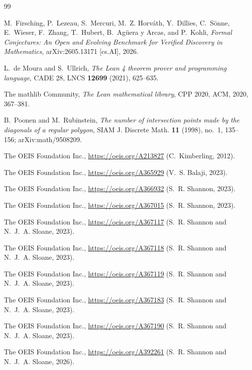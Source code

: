 \documentclass[11pt]{amsart}
\theoremstyle{plain}
\theoremstyle{definition}
\begin{document}
{\footnotesize\raggedright
\begin{thebibliography}{99}

M.~Firsching, P.~Lezeau, S.~Mercuri, M.~Z. Horv\'ath, Y.~Dillies, C.~S\"onne, E.~Wieser, F.~Zhang, T.~Hubert, B.~Ag\"uera y Arcas, and P.~Kohli, \emph{Formal Conjectures: An Open and Evolving Benchmark for Verified Discovery in Mathematics}, arXiv:2605.13171 [cs.AI], 2026.

L.~de Moura and S.~Ullrich, \emph{The Lean 4 theorem prover and programming language}, CADE 28, LNCS \textbf{12699} (2021), 625--635.

The mathlib Community, \emph{The Lean mathematical library}, CPP 2020, ACM, 2020, 367--381.

B.~Poonen and M.~Rubinstein, \emph{The number of intersection points made by the diagonals of a regular polygon}, SIAM J. Discrete Math. \textbf{11} (1998), no.~1, 135--156; arXiv:math/9508209.

The OEIS Foundation Inc., \url{https://oeis.org/A213827} (C.~Kimberling, 2012).

The OEIS Foundation Inc., \url{https://oeis.org/A365929} (V.~S. Balaji, 2023).

The OEIS Foundation Inc., \url{https://oeis.org/A366932} (S.~R. Shannon, 2023).

The OEIS Foundation Inc., \url{https://oeis.org/A367015} (S.~R. Shannon, 2023).

The OEIS Foundation Inc., \url{https://oeis.org/A367117} (S.~R. Shannon and N.~J.~A. Sloane, 2023).

The OEIS Foundation Inc., \url{https://oeis.org/A367118} (S.~R. Shannon and N.~J.~A. Sloane, 2023).

The OEIS Foundation Inc., \url{https://oeis.org/A367119} (S.~R. Shannon and N.~J.~A. Sloane, 2023).

The OEIS Foundation Inc., \url{https://oeis.org/A367183} (S.~R. Shannon and N.~J.~A. Sloane, 2023).

The OEIS Foundation Inc., \url{https://oeis.org/A367190} (S.~R. Shannon and N.~J.~A. Sloane, 2023).

The OEIS Foundation Inc., \url{https://oeis.org/A392261} (S.~R. Shannon and N.~J.~A. Sloane, 2026).

\end{thebibliography}
}
\end{document}
